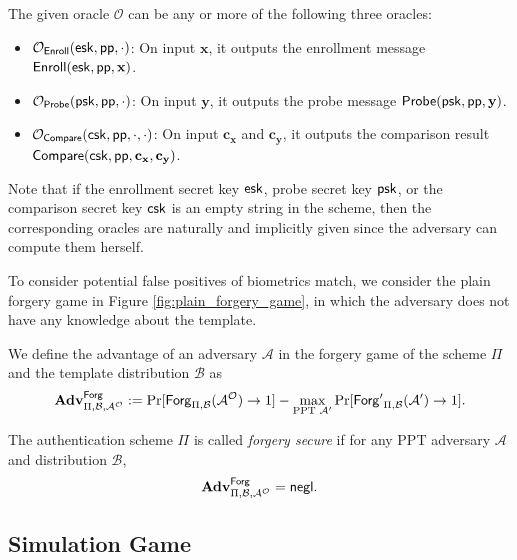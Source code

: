 The given oracle $\mathcal{O}$ can be any or more of the following three oracles:

\begin{itemize}

	\item $\mathcal{O}_{\sf Enroll}({\sf esk}, {\sf pp}, \cdot)$: On input $\mathbf{x}$, it outputs the enrollment message ${\sf Enroll}({\sf esk}, {\sf pp}, \mathbf{x})$.

	\item $\mathcal{O}_{\sf Probe}({\sf psk}, {\sf pp}, \cdot)$: On input $\mathbf{y}$, it outputs the probe message ${\sf Probe}({\sf psk}, {\sf pp}, \mathbf{y})$.

	\item $\mathcal{O}_{\sf Compare}({\sf csk}, {\sf pp}, \cdot, \cdot)$: On input $\mathbf{c_x}$ and $\mathbf{c_y}$, it outputs the comparison result ${\sf Compare}( {\sf csk}, {\sf pp}, \mathbf{c_x}, \mathbf{c_y} )$.

\end{itemize}

Note that if the enrollment secret key ${\sf esk}$, probe secret key ${\sf psk}$, or the comparison secret key ${\sf csk}$ is an empty string in the scheme, then the corresponding oracles are naturally and implicitly given since the adversary can compute them herself. 

To consider potential false positives of biometrics match, we consider the plain forgery game in Figure \ref{fig:plain_forgery_game}, in which the adversary does not have any knowledge about the template. 

We define the advantage of an adversary $\mathcal{A}$ in the forgery game of the scheme $\Pi$ and the template distribution $\mathcal{B}$ as
\[
	\mathbf{Adv}^{\sf Forg}_{\Pi, \mathcal{B}, \mathcal{A}^\mathcal{O}} := \Pr[{\sf Forg}_{\Pi, \mathcal{B}}(\mathcal{A}^\mathcal{O}) \to 1] -
	\max_{\text{PPT } \mathcal{A}'} \Pr[{\sf Forg'}_{\Pi, \mathcal{B}}(\mathcal{A}') \to 1].
\]

The authentication scheme $\Pi$ is called \emph{forgery secure} if for any PPT adversary $\mathcal{A}$ and distribution $\mathcal{B}$,
\[
	\mathbf{Adv}^{\sf Forg}_{\Pi, \mathcal{B}, \mathcal{A^\mathcal{O}}} = \mathsf{negl}.
\]


\subsection*{Simulation Game}
\label{sec:simulation_game}

